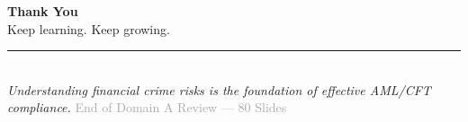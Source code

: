 \documentclass[12pt,aspectratio=169]{beamer}
\begin{document}
	\begin{frame}
		\centering
		\vspace{2.5cm}
		{\fontsize{16}{19}\selectfont \textbf{Thank You}} \\[0.2cm]
		{\fontsize{11}{13}\selectfont Keep learning. Keep growing.} \\[0.15cm]
		\rule{3cm}{0.5pt} \\[0.15cm]
		{\fontsize{8}{10}\selectfont \textit{Understanding financial crime risks is the foundation of effective AML/CFT compliance.}}
		\vspace{0.3cm}
		{\fontsize{7}{9}\selectfont \textcolor{darkgray}{End of Domain A Review — 80 Slides}}
	\end{frame}
	
\end{document}
